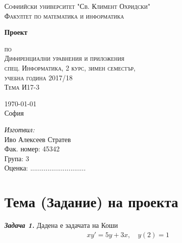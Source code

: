 \documentclass[a4paper, 12pt]{article}
\newcommand{\univname}{Софиийски университет "Св. Климент Охридски"\\Факултет по математика и информатика}
\begin{document}
\begin{titlepage}
\begin{center}
    
\vspace*{.06\textheight}
{\scshape\large \univname\par}\vspace{1.5cm}

{\huge \bfseries{Проект}\par}\vspace{0.7cm}
\textsc{\small по}\\[0.6cm]
\textsc{\Large Дифиренциални уравнения и приложения}\\[0.5cm]
\textsc{\normalsize спец. Информатика, 2 курс, зимен семестър,}\\[0.5cm]
\textsc{\normalsize учебна година 2017/18}\\[0.6cm]
\textsc{\large Тема И17-3}\\[3cm]
     
\begin{minipage}[t]{0.4\textwidth}
\begin{flushleft} \large
{\large \today}\\[1cm]
София
\end{flushleft}
\end{minipage}
\begin{minipage}[t]{0.4\textwidth}
\begin{flushright} \large
\emph{Изготвил:}\\[0.5cm]
Иво Алексеев Стратев\\[0.5cm]
Фак. номер: 45342\\[0.2cm]
Група: 3\\[2cm]
Оценка: .............................
\end{flushright}
\end{minipage}
\end{center}
\end{titlepage}

\tableofcontents

\listoffigures

\pagebreak

\section{Тема (Задание) на проекта}

\textbf{\textit{Задача 1.}} Дадена е задачата на Коши
\begin{align*} 
    xy' = 5y + 3x, \quad y(2) = 1
\end{align*}
\end{document}
